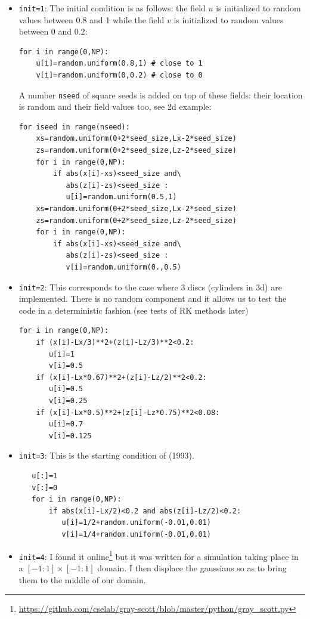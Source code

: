 \begin{itemize}
\item \lstinline{init=1}:
The initial condition is as follows: the field $u$ is initialized
to random values between 0.8 and 1 while the field $v$ is 
initialized to random values between 0 and 0.2:
\begin{lstlisting}
for i in range(0,NP):
    u[i]=random.uniform(0.8,1) # close to 1
    v[i]=random.uniform(0,0.2) # close to 0 
\end{lstlisting}
A number \lstinline{nseed} of square seeds is added on top
of these fields: their location is random and their field values too,
see 2d example:
\begin{lstlisting}
for iseed in range(nseed):
    xs=random.uniform(0+2*seed_size,Lx-2*seed_size)
    zs=random.uniform(0+2*seed_size,Lz-2*seed_size)
    for i in range(0,NP):
        if abs(x[i]-xs)<seed_size and\
           abs(z[i]-zs)<seed_size :
           u[i]=random.uniform(0.5,1)
    xs=random.uniform(0+2*seed_size,Lx-2*seed_size)
    zs=random.uniform(0+2*seed_size,Lz-2*seed_size)
    for i in range(0,NP):
        if abs(x[i]-xs)<seed_size and\
           abs(z[i]-zs)<seed_size :
           v[i]=random.uniform(0.,0.5)
\end{lstlisting}

\item \lstinline{init=2}: 
This corresponds to the case where 3 discs (cylinders in 3d)
are implemented. There is no random component and it allows 
us to test the code in a deterministic fashion (see 
tests of RK methods later)
\begin{lstlisting}
for i in range(0,NP):
    if (x[i]-Lx/3)**2+(z[i]-Lz/3)**2<0.2:
       u[i]=1
       v[i]=0.5
    if (x[i]-Lx*0.67)**2+(z[i]-Lz/2)**2<0.2:
       u[i]=0.5
       v[i]=0.25
    if (x[i]-Lx*0.5)**2+(z[i]-Lz*0.75)**2<0.08:
       u[i]=0.7
       v[i]=0.125
\end{lstlisting}

\item \lstinline{init=3}: 
This is the starting condition of \textcite{pear93} (1993).
\begin{lstlisting}
   u[:]=1
   v[:]=0
   for i in range(0,NP):
       if abs(x[i]-Lx/2)<0.2 and abs(z[i]-Lz/2)<0.2:
          u[i]=1/2+random.uniform(-0.01,0.01)
          v[i]=1/4+random.uniform(-0.01,0.01)
\end{lstlisting}

\item \lstinline{init=4}: I found it 
online\footnote{\url{https://github.com/cselab/gray-scott/blob/master/python/gray_scott.py}}
but it was written for a simulation taking place in a $[-1:1]\times[-1:1]$ domain.
I then displace the gaussians so as to bring them to the middle of our domain.


\end{itemize}
